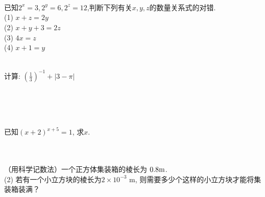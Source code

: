 \\ \\ \\
\item{
    已知$2^x=3, 2^y=6, 2^z=12$,判断下列有关$x, y, z$的数量关系式的对错.\\
    (1) $x+z=2y$\\
    (2) $x+y+3=2z$\\
    (3) $4x=z$\\
    (4) $x+1=y$
}
\\ \\
\item{
    计算: $ (\frac{1}{3})^{-1} + \lvert 3-\pi \rvert $
    \iffalse
    \fangsong\zihao{4}
    思路: 去绝对值符号,运算到底.

    解答: 
    \begin{align*}
        \mbox{原式} &= 3 + \pi - 3\\
        &= \pi.
    \end{align*}
    \fi
}
\\ \\ \\
\item{
    已知$(x+2)^{x+5}=1$, 求$x$.
}
\\ \\ \\
\item{
    （用科学记数法）一个正方体集装箱的棱长为 $0.8 \rm{m}$.\\
    (2) 若有一个小立方块的棱长为$2\times 10^{-3} $ m, 则需要多少个这样的小立方块才能将集装箱装满？
    \iffalse
    \fangsong\zihao{4}
    思路: 问题（2）注意简便运算.
    \fi
}
\\ \\ \\
